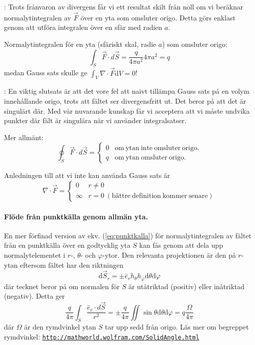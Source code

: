\documentclass[%
oneside,                 %
final,                   %
10pt]{article}
\newcommand{\longinlinecomment}[3]{{\color{red}{\bf #1}: #2}}
\begin{document}
\longinlinecomment{Comment 2}{ Trots frånvaron av divergens får vi ett resultat skilt från noll om vi beräknar normalytintegralen av $\vec F$ över en yta som omsluter origo. Detta görs enklast genom att utföra integralen över en sfär med radien $a$. }{ Trots frånvaron av divergens }

Normalytintegralen för en yta (sfäriskt skal, radie $a$) som omsluter origo:
\begin{equation}
\label{eq:punktkalla}
\int_S\vec F\cdot d\vec S= 
\frac{q}{4\pi a^2} 4\pi a^2=q
\end{equation}
medan Gauss sats skulle ge $\int_V \nabla \cdot \vec{F} \mbox{d}V = 0 $!

\longinlinecomment{Comment 3}{ En viktig slutsats är att det vore fel att naivt tillämpa Gauss sats på en volym innehållande origo, trots att fältet ser divergensfritt ut. Det beror på att det är singulärt där. Med vår nuvarande kunskap får vi acceptera att vi måste undvika punkter där fält är singulära när vi använder integralsatser. }{ En viktig slutsats är }

Mer allmänt:
\begin{equation}
\oint_S \vec F\cdot d\vec S= 
\left\{
\begin{array}{ll}
0 & \mathrm{om~ytan~inte~omsluter~origo.} \\ 
q & \mathrm{om~ytan~omsluter~origo.}
\end{array}
\right.
\end{equation}

Anledningen till att vi inte kan använda Gauss sats är
\begin{equation}
\nabla \cdot \vec{F} = 
\left\{
\begin{array}{ll}
0 & r \neq 0 \\ 
\infty & r=0 \mathrm{~(bättre~definition~kommer~senare)}
\end{array}
\right.
\end{equation}

\paragraph{Flöde från punktkälla genom allmän yta.}
En mer förfinad version av ekv. (\ref{eq:punktkalla}) för normalytintegralen av fältet från en punktkälla över en godtycklig yta $S$ kan fås genom att dela upp normalytelementet i $r$-, $\theta$- och $\varphi$-ytor. Den relevanta projektionen är den på $r$-ytan eftersom fältet har den riktningen
\begin{equation}
\mbox{d}\vec{S}_r = \pm \hat{e}_r h_\theta h_\varphi \mbox{d}\theta \mbox{d}\varphi 
\end{equation}
där tecknet beror på om normalen för $S$ är utåtriktad (positiv) eller inåtriktad (negativ). Detta ger 
\begin{equation}
\frac{q}{4\pi} \int_S \frac{\hat{e}_r\cdot d\vec S}{r^2} = \pm \frac{q}{4\pi} \iint \sin\theta \mbox{d}\theta \mbox{d}\varphi = q \frac{\Omega}{4\pi} 
\end{equation}
där $\Omega$ är den rymdvinkel ytan $S$ tar upp sedd från origo. Läs mer om begreppet rymdvinkel: \href{{http://mathworld.wolfram.com/SolidAngle.html}}{\nolinkurl{http://mathworld.wolfram.com/SolidAngle.html}}
\end{document}
